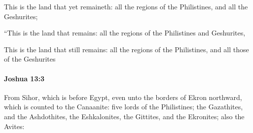 			\begin{versebox}
					\item[BHS] 
					\item[ASV] This is the land that yet remaineth: all the regions of the Philistines, and all the Geshurites;
					\item[NIV] “This is the land that remains: all the regions of the Philistines and Geshurites,
					\item[NRSV] This is the land that still remains: all the regions of the Philistines, and all those of the Geshurites
			\end{versebox}

		\paragraph{Joshua 13:3} %
			\label{JOSHUA-13-3}

			From Sihor, which is before Egypt, even unto the borders of Ekron northward, which is counted to the Canaanite: five lords of the Philistines; the Gazathites, and the Ashdothites, the Eshkalonites, the Gittites, and the Ekronites; also the Avites:

